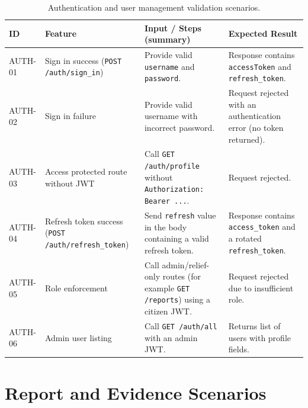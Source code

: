 \begin{table}[H]
\centering
\caption{Authentication and user management validation scenarios.}
\label{tab:appendix-auth-test-cases}
\renewcommand{\arraystretch}{1.15}
\scriptsize
\setlength{\tabcolsep}{3pt}
\begin{tabularx}{\textwidth}{|p{2.0cm}|p{3.8cm}|X|p{3.2cm}|}
\hline
\textbf{ID} & \textbf{Feature} & \textbf{Input / Steps (summary)} & \textbf{Expected Result} \\
\hline
AUTH-01 & Sign in success (\texttt{POST /auth/sign\_in}) & Provide valid \texttt{username} and \texttt{password}. & Response contains \texttt{accessToken} and \texttt{refresh\_token}. \\
\hline
AUTH-02 & Sign in failure & Provide valid username with incorrect password. & Request rejected with an authentication error (no token returned). \\
\hline
AUTH-03 & Access protected route without JWT & Call \texttt{GET /auth/profile} without \texttt{Authorization: Bearer ...}. & Request rejected. \\
\hline
AUTH-04 & Refresh token success (\texttt{POST /auth/refresh\_token}) & Send \texttt{refresh} value in the body containing a valid refresh token. & Response contains \texttt{access\_token} and a rotated \texttt{refresh\_token}. \\
\hline
AUTH-05 & Role enforcement & Call admin/relief-only routes (for example \texttt{GET /reports}) using a citizen JWT. & Request rejected due to insufficient role. \\
\hline
AUTH-06 & Admin user listing & Call \texttt{GET /auth/all} with an admin JWT. & Returns list of users with profile fields. \\
\hline
\end{tabularx}
\end{table}

\section{Report and Evidence Scenarios}


